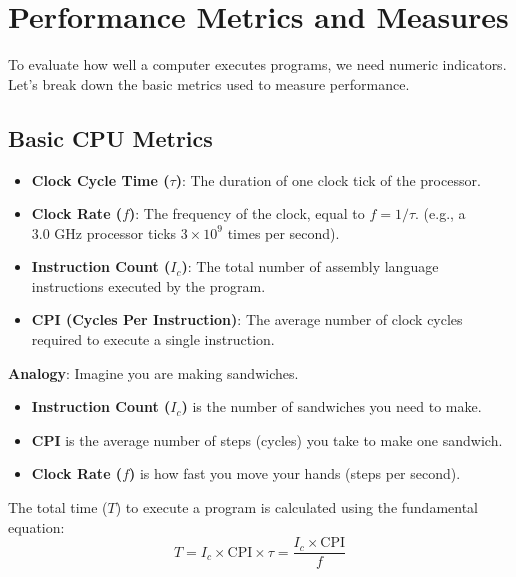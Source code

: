 \documentclass[11pt,a4paper]{article}
\begin{document}
\tableofcontents
\newpage

\section{Performance Metrics and Measures}

To evaluate how well a computer executes programs, we need numeric indicators. Let's break down the basic metrics used to measure performance.

\subsection{Basic CPU Metrics}
\begin{itemize}
    \item \textbf{Clock Cycle Time ($\tau$)}: The duration of one clock tick of the processor.
    \item \textbf{Clock Rate ($f$)}: The frequency of the clock, equal to $f = 1/\tau$. (e.g., a $3.0\text{ GHz}$ processor ticks $3 \times 10^9$ times per second).
    \item \textbf{Instruction Count ($I_c$)}: The total number of assembly language instructions executed by the program.
    \item \textbf{CPI (Cycles Per Instruction)}: The average number of clock cycles required to execute a single instruction.
\end{itemize}

\begin{notebox}
\textbf{Analogy}: 
Imagine you are making sandwiches.
\begin{itemize}
    \item \textbf{Instruction Count ($I_c$)} is the number of sandwiches you need to make.
    \item \textbf{CPI} is the average number of steps (cycles) you take to make one sandwich.
    \item \textbf{Clock Rate ($f$)} is how fast you move your hands (steps per second).
\end{itemize}
\end{notebox}

The total time ($T$) to execute a program is calculated using the fundamental equation:
\begin{equation}
    T = I_c \times \text{CPI} \times \tau = \frac{I_c \times \text{CPI}}{f}
\end{equation}
\end{document}
